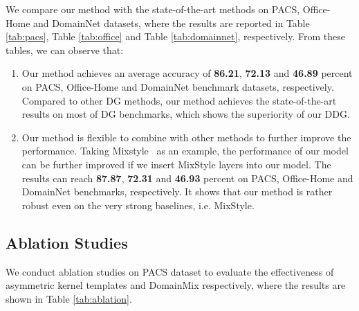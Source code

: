 \documentclass{article}
\begin{document}
We compare our method with the state-of-the-art methods on PACS, Office-Home and DomainNet datasets, where the results are reported in Table \ref{tab:pacs}, Table \ref{tab:office} and Table \ref{tab:domainnet}, respectively. From these tables, we can observe that: 
\begin{enumerate}[1)]
    \item Our method achieves an average accuracy of \textbf{86.21}, \textbf{72.13} and \textbf{46.89} percent on PACS, Office-Home and DomainNet benchmark datasets, respectively. Compared to other DG methods, our method achieves the state-of-the-art results on most of DG benchmarks, which shows the superiority of our DDG. 
\item Our method is flexible to combine with other methods to further improve the performance. Taking Mixstyle~\protect\cite{mixstyle} as an example, the performance of our model can be further improved if we insert MixStyle layers into our model. The results can reach \textbf{87.87}, \textbf{72.31} and \textbf{46.93} percent on PACS, Office-Home and DomainNet benchmarks, respectively. It shows that our method is rather robust even on the very strong baselines, i.e. MixStyle.
\end{enumerate}

\subsection{Ablation Studies}
We conduct ablation studies on PACS dataset to evaluate the effectiveness of asymmetric kernel templates and DomainMix respectively, where the results are shown in Table \ref{tab:ablation}.
\begin{table*}[t]
  \centering
  \setlength\tabcolsep{12pt}
  \vspace{-0.2cm}
  \caption{Results of ablation studies in terms of asymmetric kernel templates and DomainMix on PACS dataset.}
  \label{tab:ablation}\end{table*}
\end{document}
